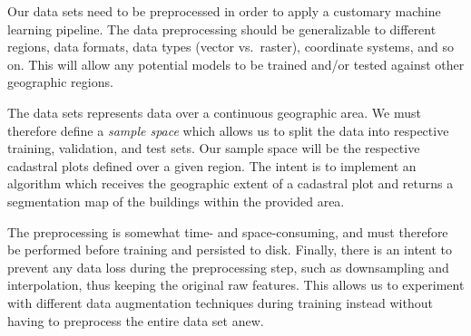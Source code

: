 Our data sets need to be preprocessed in order to apply a customary machine learning pipeline.
The data preprocessing should be generalizable to different regions, data formats, data types (vector vs.\ raster), coordinate systems, and so on.
This will allow any potential models to be trained and/or tested against other geographic regions.

The data sets represents data over a continuous geographic area.
We must therefore define a \textit{sample space} which allows us to split the data into respective training, validation, and test sets.
Our sample space will be the respective cadastral plots defined over a given region.
The intent is to implement an algorithm which receives the geographic extent of a cadastral plot and returns a segmentation map of the buildings within the provided area.

The preprocessing is somewhat time- and space-consuming, and must therefore be performed before training and persisted to disk.
Finally, there is an intent to prevent any data loss during the preprocessing step, such as downsampling and interpolation, thus keeping the original raw features.
This allows us to experiment with different data augmentation techniques during training instead without having to preprocess the entire data set anew.
